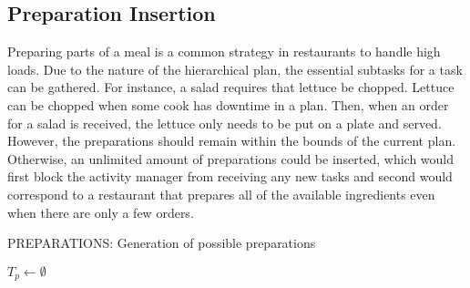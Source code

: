 \subsection{Preparation Insertion}
\label{sec:approach-preparation}

Preparing parts of a meal is a common strategy in restaurants to handle high loads.
Due to the nature of the hierarchical plan, the essential subtasks for a task can be gathered.
For instance, a salad requires that lettuce be chopped.  
Lettuce can be chopped when some cook has downtime in a plan.
Then, when an order for a salad is received, the lettuce only needs to be put on a plate and served.
However, the preparations should remain within the bounds of the current plan.
Otherwise, an unlimited amount of preparations could be inserted, which would first block the activity manager from receiving any new tasks and second would correspond to a restaurant that prepares all of the available ingredients even when there are only a few orders.

\begin{algorithm}[t]
    \caption{PREPARATIONS: Generation of possible preparations}
    \label{alg:methodology:preparations}
    $T_p \leftarrow \emptyset$\;
\end{algorithm}

